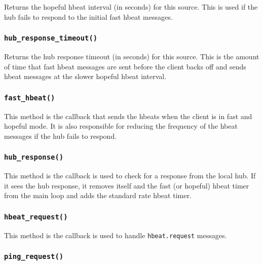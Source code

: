 Returns the hopeful hbeat interval (in seconds) for this source.
This is used if the hub fails to respond to the initial fast hbeat
messages.

\subsubsection*{\texttt{hub\_response\_timeout()}\label{xPL::Client_hub_response_timeout_}}


Returns the hub response timeout (in seconds) for this source.  This
is the amount of time that fast hbeat messages are sent before the
client backs off and sends hbeat messages at the slower hopeful hbeat
interval.

\subsubsection*{\texttt{fast\_hbeat()}\label{xPL::Client_fast_hbeat_}}


This method is the callback that sends the hbeats when the
client is in fast and hopeful mode.  It is also responsible
for reducing the frequency of the hbeat messages if the
hub fails to respond.

\subsubsection*{\texttt{hub\_response()}\label{xPL::Client_hub_response_}}


This method is the callback is used to check for a response from the
local hub.  If it sees the hub response, it removes itself and the
fast (or hopeful) hbeat timer from the main loop and adds the
standard rate hbeat timer.

\subsubsection*{\texttt{hbeat\_request()}\label{xPL::Client_hbeat_request_}}


This method is the callback is used to handle \texttt{hbeat.request} messages.

\subsubsection*{\texttt{ping\_request()}\label{xPL::Client_ping_request_}}


